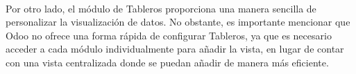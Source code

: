 \paragraph{}
Por otro lado, el módulo de Tableros proporciona una manera sencilla de personalizar la visualización de datos. No obstante, es importante mencionar que Odoo no ofrece una forma rápida de configurar Tableros, ya que es necesario acceder a cada módulo individualmente para añadir la vista, en lugar de contar con una vista centralizada donde se puedan añadir de manera más eficiente.
